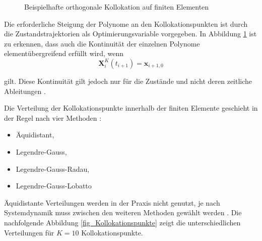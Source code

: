 \begin{figure}[h!]
    \centering
    \setlength{\fboxsep}{1pt}
    \setlength{\fboxrule}{1pt}
    \caption[Beispielhafte orthogonale Kollokation auf finiten Elementen]{Beispielhafte orthogonale Kollokation auf finiten Elementen \cite{Dompc1}}
    \label{fig_Collocationdompc}
\end{figure}

Die erforderliche Steigung der Polynome an den Kollokationspunkten ist durch die Zustandstrajektorien als Optimierungsvariable vorgegeben.
In Abbildung \ref{fig_Collocationdompc} ist zu erkennen, dass auch die Kontinuität der einzelnen Polynome elementübergreifend erfüllt wird, wenn
\begin{equation} \label{eq_KontiDompc}
    \boldsymbol{X}^{K}_{i}(t_{i+1})=\boldsymbol{x}_{i+1,0}
\end{equation}

\vspace*{-\baselineskip}gilt.
Diese Kontinuität gilt jedoch nur für die Zustände und nicht deren zeitliche Ableitungen \cite[S.2]{Cizniar}.

Die Verteilung der Kollokationspunkte innerhalb der finiten Elemente geschieht in der Regel nach vier Methoden \cite[S.48]{Huntington}:
\begin{itemize}
    \item Äquidistant,
    \item Legendre-Gauss,
    \item Legendre-Gauss-Radau,
    \item Legendre-Gauss-Lobatto
\end{itemize}
Äquidistante Verteilungen werden in der Praxis nicht genutzt, je nach Systemdynamik muss zwischen den weiteren Methoden gewählt werden \cite{Huntington}.
Die nachfolgende Abbildung \ref{fig_Kollokationspunkte} zeigt die unterschiedlichen Verteilungen für $K=10$ Kollokationspunkte.

